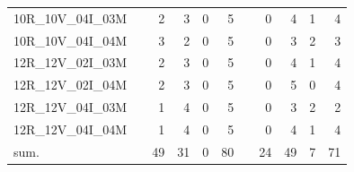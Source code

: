 \begin{tabular}{llrrrrlrrrr}
10R\_10V\_04I\_03M & \hspace{0.1cm} & 2 & 3 & 0 & 5 & \hspace{0.2cm} & 0 & 4 & 1 & 4\\
10R\_10V\_04I\_04M & \hspace{0.1cm} & 3 & 2 & 0 & 5 & \hspace{0.2cm} & 0 & 3 & 2 & 3\\
\addlinespace
12R\_12V\_02I\_03M & \hspace{0.1cm} & 2 & 3 & 0 & 5 & \hspace{0.2cm} & 0 & 4 & 1 & 4\\
12R\_12V\_02I\_04M & \hspace{0.1cm} & 2 & 3 & 0 & 5 & \hspace{0.2cm} & 0 & 5 & 0 & 4\\
12R\_12V\_04I\_03M & \hspace{0.1cm} & 1 & 4 & 0 & 5 & \hspace{0.2cm} & 0 & 3 & 2 & 2\\
12R\_12V\_04I\_04M & \hspace{0.1cm} & 1 & 4 & 0 & 5 & \hspace{0.2cm} & 0 & 4 & 1 & 4\\
\addlinespace
sum. & \hspace{0.1cm} & 49 & 31 & 0 & 80 & \hspace{0.2cm} & 24 & 49 & 7 & 71\\
\bottomrule
\end{tabular}
